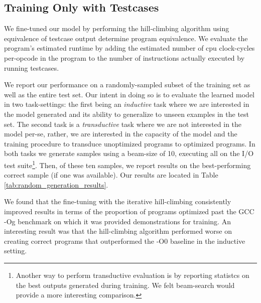 \documentclass{article}
\begin{document}
\subsection{Training Only with Testcases}



We fine-tuned our model by performing the hill-climbing algorithm using equivalence of testcase output determine program equivalence. We evaluate the program's estimated runtime by adding the estimated number of cpu clock-cycles per-opcode in the program to the number of instructions actually executed by running testcases. 

We report our performance on a randomly-sampled subset of the training set as well as the entire test set. Our intent in doing so is to evaluate the learned model in two task-settings: the first being an \textit{inductive} task where we are interested in the model generated and its ability to generalize to unseen examples in the test set. The second task is a \textit{transductive} task where we are not interested in the model per-se, rather, we are interested in the capacity of the model and the training procedure to transduce unoptimized programs to optimized programs. In both tasks we generate samples using a beam-size of 10, executing all on the I/O test suite\footnote{Another way to perform transductive evaluation is by reporting statistcs on the best outputs generated during training. We felt beam-search would provide a more interesting comparison.}. Then, of these ten samples, we report results on the best-performing correct sample (if one was available). Our results are located in Table \ref{tab:random_generation_results}. 

We found that the fine-tuning with the iterative hill-climbing consistently improved results in terms of the proportion of programs optimized past the GCC -Og benchmark on which it was provided demonstrations for training. An interesting result was that the hill-climbing algorithm performed worse on creating correct programs that outperformed the -O0 baseline in the inductive setting. 
\end{document}
